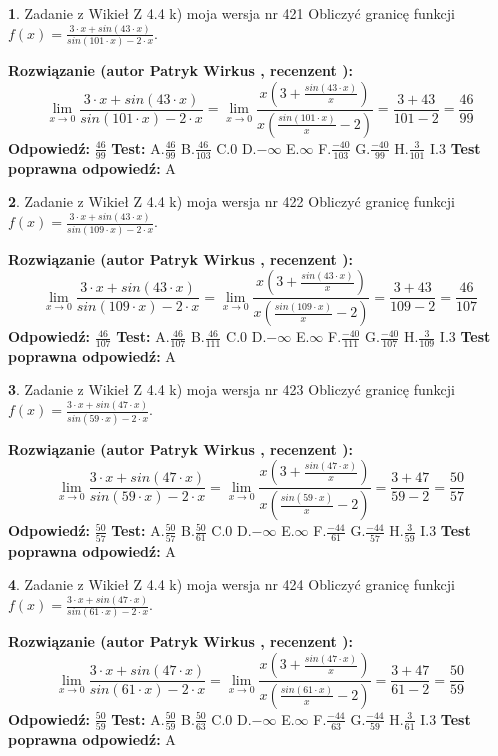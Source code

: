 \documentclass[12pt, a4paper]{article}
\theoremstyle{definition} %
\newtheorem{zad}{}
\newcommand{\zadStart}[1]{\begin{zad}#1\newline}
\newcommand{\zadStop}{\end{zad}}
\newcommand{\rozwStart}[2]{\noindent \textbf{Rozwiązanie (autor #1 , recenzent #2): }\newline}
\newcommand{\rozwStop}{\newline}
\newcommand{\odpStart}{\noindent \textbf{Odpowiedź:}\newline}
\newcommand{\odpStop}{\newline}
\newcommand{\testStart}{\noindent \textbf{Test:}\newline}
\newcommand{\testStop}{\newline}
\newcommand{\kluczStart}{\noindent \textbf{Test poprawna odpowiedź:}\newline}
\newcommand{\kluczStop}{\newline}
\begin{document}
\zadStart{Zadanie z Wikieł Z 4.4 k) moja wersja nr 421}
Obliczyć granicę funkcji $f(x)=\frac{3\cdot x +sin(43\cdot x)}{sin(101\cdot x) -2\cdot x}$.
\zadStop
\rozwStart{Patryk Wirkus}{}
$$\lim\limits_{x\to 0}\frac{3\cdot x +sin(43\cdot x)}{sin(101\cdot x) -2\cdot x}
=\lim\limits_{x\to 0}\frac{x(3+\frac{sin(43\cdot x)}{x})}{x(\frac{sin(101\cdot x)}{x}-2)}
=\frac{3+43}{101-2} = \frac{46}{99}$$
\rozwStop
\odpStart
$\frac{46}{99}$
\odpStop
\testStart
A.$\frac{46}{99}$
B.$\frac{46}{103}$
C.$0$
D.$-\infty$
E.$\infty$
F.$\frac{-40}{103}$
G.$\frac{-40}{99}$
H.$\frac{3}{101}$
I.$3$
\testStop
\kluczStart
A
\kluczStop



\zadStart{Zadanie z Wikieł Z 4.4 k) moja wersja nr 422}
Obliczyć granicę funkcji $f(x)=\frac{3\cdot x +sin(43\cdot x)}{sin(109\cdot x) -2\cdot x}$.
\zadStop
\rozwStart{Patryk Wirkus}{}
$$\lim\limits_{x\to 0}\frac{3\cdot x +sin(43\cdot x)}{sin(109\cdot x) -2\cdot x}
=\lim\limits_{x\to 0}\frac{x(3+\frac{sin(43\cdot x)}{x})}{x(\frac{sin(109\cdot x)}{x}-2)}
=\frac{3+43}{109-2} = \frac{46}{107}$$
\rozwStop
\odpStart
$\frac{46}{107}$
\odpStop
\testStart
A.$\frac{46}{107}$
B.$\frac{46}{111}$
C.$0$
D.$-\infty$
E.$\infty$
F.$\frac{-40}{111}$
G.$\frac{-40}{107}$
H.$\frac{3}{109}$
I.$3$
\testStop
\kluczStart
A
\kluczStop



\zadStart{Zadanie z Wikieł Z 4.4 k) moja wersja nr 423}
Obliczyć granicę funkcji $f(x)=\frac{3\cdot x +sin(47\cdot x)}{sin(59\cdot x) -2\cdot x}$.
\zadStop
\rozwStart{Patryk Wirkus}{}
$$\lim\limits_{x\to 0}\frac{3\cdot x +sin(47\cdot x)}{sin(59\cdot x) -2\cdot x}
=\lim\limits_{x\to 0}\frac{x(3+\frac{sin(47\cdot x)}{x})}{x(\frac{sin(59\cdot x)}{x}-2)}
=\frac{3+47}{59-2} = \frac{50}{57}$$
\rozwStop
\odpStart
$\frac{50}{57}$
\odpStop
\testStart
A.$\frac{50}{57}$
B.$\frac{50}{61}$
C.$0$
D.$-\infty$
E.$\infty$
F.$\frac{-44}{61}$
G.$\frac{-44}{57}$
H.$\frac{3}{59}$
I.$3$
\testStop
\kluczStart
A
\kluczStop



\zadStart{Zadanie z Wikieł Z 4.4 k) moja wersja nr 424}
Obliczyć granicę funkcji $f(x)=\frac{3\cdot x +sin(47\cdot x)}{sin(61\cdot x) -2\cdot x}$.
\zadStop
\rozwStart{Patryk Wirkus}{}
$$\lim\limits_{x\to 0}\frac{3\cdot x +sin(47\cdot x)}{sin(61\cdot x) -2\cdot x}
=\lim\limits_{x\to 0}\frac{x(3+\frac{sin(47\cdot x)}{x})}{x(\frac{sin(61\cdot x)}{x}-2)}
=\frac{3+47}{61-2} = \frac{50}{59}$$
\rozwStop
\odpStart
$\frac{50}{59}$
\odpStop
\testStart
A.$\frac{50}{59}$
B.$\frac{50}{63}$
C.$0$
D.$-\infty$
E.$\infty$
F.$\frac{-44}{63}$
G.$\frac{-44}{59}$
H.$\frac{3}{61}$
I.$3$
\testStop
\kluczStart
A
\kluczStop
\end{document}
